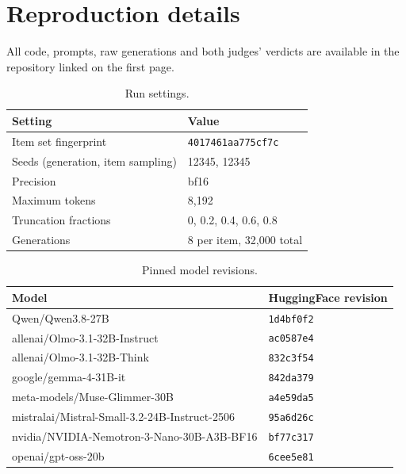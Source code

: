 \documentclass[11pt]{article}
\begin{document}
\appendix

\section{Reproduction details}

All code, prompts, raw generations and both judges' verdicts are available in the repository
linked on the first page.

\begin{table}[h]
  \centering\small
  \caption{Run settings.}
  \begin{tabular}{ll}
    \toprule
    Setting & Value \\
    \midrule
    Item set fingerprint & \texttt{4017461aa775cf7c} \\
    Seeds (generation, item sampling) & 12345, 12345 \\
    Precision & bf16 \\
    Maximum tokens & 8{,}192 \\
    Truncation fractions & 0, 0.2, 0.4, 0.6, 0.8 \\
    Generations & 8 per item, 32{,}000 total \\
    \bottomrule
  \end{tabular}
\end{table}

\begin{table}[h]
  \centering\small
  \caption{Pinned model revisions.}
  \begin{tabular}{ll}
    \toprule
    Model & HuggingFace revision \\
    \midrule
    Qwen/Qwen3.8-27B & \texttt{1d4bf0f2} \\
    allenai/Olmo-3.1-32B-Instruct & \texttt{ac0587e4} \\
    allenai/Olmo-3.1-32B-Think & \texttt{832c3f54} \\
    google/gemma-4-31B-it & \texttt{842da379} \\
    meta-models/Muse-Glimmer-30B & \texttt{a4e59da5} \\
    mistralai/Mistral-Small-3.2-24B-Instruct-2506 & \texttt{95a6d26c} \\
    nvidia/NVIDIA-Nemotron-3-Nano-30B-A3B-BF16 & \texttt{bf77c317} \\
    openai/gpt-oss-20b & \texttt{6cee5e81} \\
    \bottomrule
  \end{tabular}
\end{table}
\end{document}
